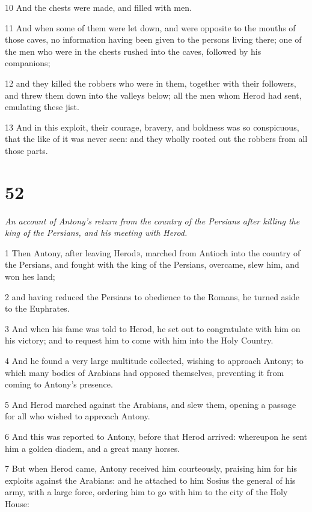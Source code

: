 10 And the chests were made, and filled with men. 

11 And when some of them were let down, and were opposite to the mouths of those caves, no information having been given to the persons living there; one of the men who were in the chests rushed into the caves, followed by his companions; 

12 and they killed the robbers who were in them, together with their followers, and threw them down into the valleys below; all the men whom Herod had sent, emulating these jist. 

13 And in this exploit, their courage, bravery, and boldness was so conspicuous, that the like of it was never seen: and they wholly rooted out the robbers from all those parts. 

\chapter{52} 

\par \textit{An account of Antony's return from the country of the Persians after killing the king of the Persians, and his meeting with Herod.}

1 Then Antony, after leaving Herod», marched from Antioch into the country of the Persians, and fought with the king of the Persians, overcame, slew him, and won hes land; 

2 and having reduced the Persians to obedience to the Romans, he turned aside to the Euphrates. 

3 And when his fame was told to Herod, he set out to congratulate with him on his victory; and to request him to come with him into the Holy Country. 

4 And he found a very large multitude collected, wishing to approach Antony; to which many bodies of Arabians had opposed themselves, preventing it from coming to Antony’s presence. 

5 And Herod marched against the Arabians, and slew them, opening a passage for all who wished to approach Antony. 

6 And this was reported to Antony, before that Herod arrived: whereupon he sent him a golden diadem, and a great many horses. 

7 But when Herod came, Antony received him courteously, praising him for his exploits against the Arabians: and he attached to him Sosius the general of his army, with a large force, ordering him to go with him to the city of the Holy House: 

